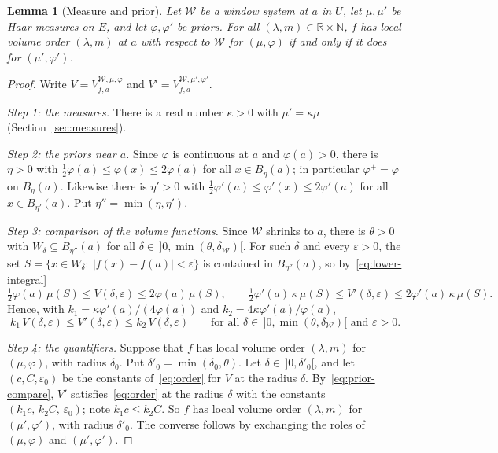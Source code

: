 \documentclass[11pt,a4paper]{article}
\newtheorem{lemma}[theorem]{Lemma}
\theoremstyle{definition}
\theoremstyle{remark}
\numberwithin{equation}{section}
\newcommand{\N}{\mathbb{N}}
\newcommand{\R}{\mathbb{R}}
\newcommand{\abs}[1]{\lvert #1\rvert}
\newcommand{\eps}{\varepsilon}
\begin{document}
\begin{lemma}[Measure and prior]\label{lem:prior}
Let $\mathcal W$ be a window system at $a$ in $U$, let $\mu,\mu'$ be Haar measures on $E$, and let $\varphi,\varphi'$ be priors. For all $(\lambda,m)\in\R\times\N$, $f$ has local volume order $(\lambda,m)$ at $a$ with respect to $\mathcal W$ for $(\mu,\varphi)$ if and only if it does for $(\mu',\varphi')$.
\end{lemma}
\begin{proof}
Write $V=V^{\mathcal W,\mu,\varphi}_{f,a}$ and $V'=V^{\mathcal W,\mu',\varphi'}_{f,a}$.

\emph{Step 1: the measures.} There is a real number $\kappa>0$ with $\mu'=\kappa\mu$ (Section~\ref{sec:measures}).

\emph{Step 2: the priors near $a$.} Since $\varphi$ is continuous at $a$ and $\varphi(a)>0$, there is $\eta>0$ with $\frac{1}{2}\varphi(a)\le\varphi(x)\le2\varphi(a)$ for all $x\in B_\eta(a)$; in particular $\varphi^+=\varphi$ on $B_\eta(a)$. Likewise there is $\eta'>0$ with $\frac{1}{2}\varphi'(a)\le\varphi'(x)\le2\varphi'(a)$ for all $x\in B_{\eta'}(a)$. Put $\eta''=\min(\eta,\eta')$.

\emph{Step 3: comparison of the volume functions.} Since $\mathcal W$ shrinks to $a$, there is $\theta>0$ with $W_\delta\subseteq B_{\eta''}(a)$ for all $\delta\in\,]0,\min(\theta,\delta_{\mathcal W})[$. For such $\delta$ and every $\eps>0$, the set $S=\{x\in W_\delta:\ \abs{f(x)-f(a)}<\eps\}$ is contained in $B_{\eta''}(a)$, so by~\eqref{eq:lower-integral}
\[
\tfrac12\varphi(a)\,\mu(S)\le V(\delta,\eps)\le2\varphi(a)\,\mu(S),\qquad\tfrac12\varphi'(a)\,\kappa\,\mu(S)\le V'(\delta,\eps)\le2\varphi'(a)\,\kappa\,\mu(S).
\]
Hence, with $k_1=\kappa\varphi'(a)/(4\varphi(a))$ and $k_2=4\kappa\varphi'(a)/\varphi(a)$,
\begin{equation}\label{eq:prior-compare}
k_1\,V(\delta,\eps)\le V'(\delta,\eps)\le k_2\,V(\delta,\eps)\qquad\text{for all }\delta\in\,]0,\min(\theta,\delta_{\mathcal W})[\text{ and }\eps>0 .
\end{equation}

\emph{Step 4: the quantifiers.} Suppose that $f$ has local volume order $(\lambda,m)$ for $(\mu,\varphi)$, with radius $\delta_0$. Put $\delta'_0=\min(\delta_0,\theta)$. Let $\delta\in\,]0,\delta'_0[$, and let $(c,C,\eps_0)$ be the constants of~\eqref{eq:order} for $V$ at the radius $\delta$. By~\eqref{eq:prior-compare}, $V'$ satisfies~\eqref{eq:order} at the radius $\delta$ with the constants $(k_1c,\,k_2C,\,\eps_0)$; note $k_1c\le k_2C$. So $f$ has local volume order $(\lambda,m)$ for $(\mu',\varphi')$, with radius $\delta'_0$. The converse follows by exchanging the roles of $(\mu,\varphi)$ and $(\mu',\varphi')$.
\end{proof}
\end{document}
